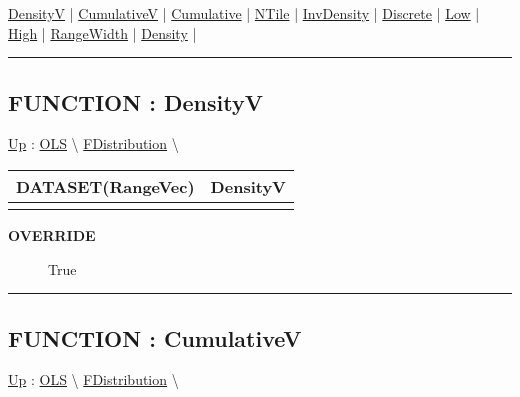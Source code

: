 \par


\hyperlink{ecldoc:linearregression.ols.distributionbase.densityv}{DensityV}  |
\hyperlink{ecldoc:linearregression.ols.distributionbase.cumulativev}{CumulativeV}  |
\hyperlink{ecldoc:linearregression.ols.distributionbase.cumulative}{Cumulative}  |
\hyperlink{ecldoc:linearregression.ols.distributionbase.ntile}{NTile}  |
\hyperlink{ecldoc:linearregression.ols.distributionbase.invdensity}{InvDensity}  |
\hyperlink{ecldoc:linearregression.ols.distributionbase.discrete}{Discrete}  |
\hyperlink{ecldoc:linearregression.ols.fdistribution.low}{Low}  |
\hyperlink{ecldoc:linearregression.ols.fdistribution.high}{High}  |
\hyperlink{ecldoc:linearregression.ols.fdistribution.rangewidth}{RangeWidth}  |
\hyperlink{ecldoc:linearregression.ols.fdistribution.density}{Density}  |

\rule{\linewidth}{0.5pt}

\subsection*{FUNCTION : DensityV}
\hypertarget{ecldoc:linearregression.ols.distributionbase.densityv}{}
\hyperlink{ecldoc:linearregression.ols.fdistribution}{Up} :
\hspace{0pt} \hyperlink{ecldoc:linearregression.ols}{OLS} \textbackslash 
\hspace{0pt} \hyperlink{ecldoc:linearregression.ols.fdistribution}{FDistribution} \textbackslash 

{\renewcommand{\arraystretch}{1.5}
\begin{tabularx}{\textwidth}{|>{\raggedright\arraybackslash}l|X|}
\hline
\hspace{0pt}DATASET(RangeVec) & DensityV \\
\hline
\multicolumn{2}{|>{\raggedright\arraybackslash}X|}{\hspace{0pt}()} \\
\hline
\end{tabularx}
}

\par

\par
\begin{description}
\item [\textbf{OVERRIDE}] True
\end{description}

\rule{\linewidth}{0.5pt}
\subsection*{FUNCTION : CumulativeV}
\hypertarget{ecldoc:linearregression.ols.distributionbase.cumulativev}{}
\hyperlink{ecldoc:linearregression.ols.fdistribution}{Up} :
\hspace{0pt} \hyperlink{ecldoc:linearregression.ols}{OLS} \textbackslash 
\hspace{0pt} \hyperlink{ecldoc:linearregression.ols.fdistribution}{FDistribution} \textbackslash 

